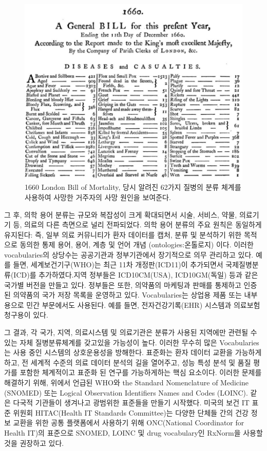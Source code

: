 \documentclass[11pt]{book}
\theoremstyle{definition}
\theoremstyle{definition}
\theoremstyle{definition}
\theoremstyle{remark}
\begin{document}
\begin{figure}

{\centering \includegraphics[width=1\linewidth]{images/StandardizedVocabularies/bill} 

}

\caption{1660 London Bill of Mortality, 당시 알려진 62가지 질병의 분류 체계를 사용하여 사망한 거주자의 사망 원인을 보여준다.}\label{fig:bill}
\end{figure}

그 후, 의학 용어 분류는 규모와 복잡성이 크게 확대되면서 시술, 서비스,
약물, 의료기기 등, 의료의 다른 측면으로 널리 전파되었다. 의학 용어
분류의 주요 원칙은 동일하게 유지된다: 즉, 일부 의료 커뮤니티가 환자
데이터를 캡처, 분류 및 분석하기 위한 목적으로 동의한 통제 용어, 용어,
계층 및 언어 개념 (ontologies:온톨로지) 이다. 이러한 vocabularies의
상당수는 공공기관과 정부기관에서 장기적으로 의무 관리하고 있다. 예를
들면, 세계보건기구(WHO)는 최근 11차 개정판(ICD11)이 추가되면서
국제질병분류(ICD)를 추가하였다.지역 정부들은 ICD10CM(USA), ICD10GM(독일)
등과 같은 국가별 버전을 만들고 있다. 정부들은 또한, 의약품의 마케팅과
판매를 통제하고 인증된 의약품의 국가 저장 목록을 운영하고 있다.
Vocabularies는 상업용 제품 또는 내부용으로 민간 부문에서도 사용된다.
예를 들면, 전자건강기록(EHR) 시스템과 의료보험청구용이 있다.

그 결과, 각 국가, 지역, 의료시스템 및 의료기관은 분류가 사용된 지역에만
관련될 수 있는 자체 질병분류체계를 갖고있을 가능성이 높다. 이러한 무수히
많은 Vocabularies는 사용 중인 시스템의 상호운용성을 방해한다. 표준화는
환자 데이터 교환을 가능하게 하고, 전 세계적 수준의 의료 데이터 분석의
길을 열어주고, 성능 특성 분석 및 품질 평가를 포함한 체계적이고 표준화 된
연구를 가능하게하는 핵심 요소이다. 이러한 문제를 해결하기 위해, 위에서
언급된 WHO와 the Standard Nomenclature of Medicine (SNOMED) 또는 Logical
Observation Identifiers Names and Codes (LOINC). 같은 다국적 기관들이
생겨나고 광범위한 표준들을 만들기 시작했다. 미국의 보건 IT 표준 위원회
HITAC(Health IT Standards Committee)는 다양한 단체들 간의 건강 정보
교환을 위한 공통 플랫폼에서 사용하기 위해 ONC(National Coordinator for
Health IT)의 표준으로 SNOMED, LOINC 및 drug vocabulary인 RxNorm을 사용할
것을 권장하고 있다.
\end{document}
